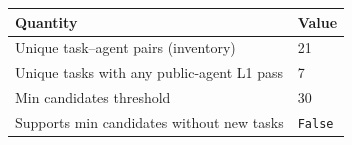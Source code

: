 \begin{tabular}{ll}
\hline
Quantity & Value \\
\hline
Unique task--agent pairs (inventory) & 21 \\
Unique tasks with any public-agent L1 pass & 7 \\
Min candidates threshold & 30 \\
Supports min candidates without new tasks & \texttt{False} \\
\hline
\end{tabular}
